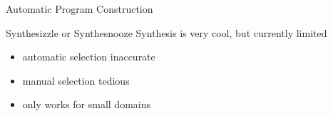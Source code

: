 \documentclass{beamer}
\begin{document}
\begin{frame}{Automatic Program Construction}
  \begin{block}{Synthesizzle or Synthesnooze}
    Synthesis is very cool, but currently limited

    \begin{itemize}
      \item automatic selection inaccurate
      \item manual selection tedious
      \item only works for small domains
    \end{itemize}
  \end{block}
\end{frame}









% 
\end{document}
